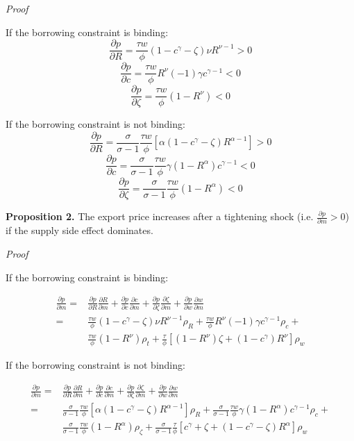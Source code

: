 \textit{Proof}

If the borrowing constraint is binding:
$$
\frac{\partial p}{\partial R}=\frac{\tau w}{\phi}(1-c^\gamma-\zeta)\nu R^{\nu-1}>0
$$
$$
\frac{\partial p}{\partial c}=\frac{\tau w}{\phi} R^\nu(-1)\gamma c^{\gamma-1}<0
$$
$$
\frac{\partial p}{\partial \zeta}=\frac{\tau w}{\phi}(1-R^\nu)<0
$$

If the borrowing constraint is not binding:
$$
\frac{\partial p}{\partial R}=\frac{\sigma}{\sigma-1}\frac{\tau w}{\phi}[\alpha(1-c^\gamma-\zeta)R^{\alpha-1}]>0
$$
$$
\frac{\partial p}{\partial c}=\frac{\sigma}{\sigma-1}\frac{\tau w}{\phi}\gamma(1-R^\alpha)c^{\gamma-1}<0
$$
$$
\frac{\partial p}{\partial \zeta}=\frac{\sigma}{\sigma-1}\frac{\tau w}{\phi} (1-R^\alpha)<0
$$


\textbf{Proposition 2.} The export price increases after a tightening shock (i.e. $\frac{\partial p}{\partial m}>0$) if the supply side effect dominates.

\textit{Proof}

If the borrowing constraint is binding:

\begin{align*} 
\frac{\partial p}{\partial m} =&\frac{\partial p}{\partial R}\frac{\partial R}{\partial m}+\frac{\partial p}{\partial c}\frac{\partial c}{\partial m}+\frac{\partial p}{\partial \zeta}\frac{\partial \zeta}{\partial m}+\frac{\partial p}{\partial w}\frac{\partial w}{\partial m}  \\
=& \frac{\tau w}{\phi}(1-c^\gamma-\zeta)\nu R^{\nu-1} \rho_R+ \frac{\tau w}{\phi} R^\nu(-1)\gamma c^{\gamma-1} \rho_c +\\  
& \frac{\tau w}{\phi}(1-R^\nu) \rho_t+\frac{\tau}{\phi}[(1-R^\nu)\zeta+(1-c^\gamma)R^\nu] \rho_w
\end{align*} 

If the borrowing constraint is not binding:

\begin{align*} 
\frac{\partial p}{\partial m} =&\frac{\partial p}{\partial R}\frac{\partial R}{\partial m}+\frac{\partial p}{\partial c}\frac{\partial c}{\partial m}+\frac{\partial p}{\partial \zeta}\frac{\partial \zeta}{\partial m}+\frac{\partial p}{\partial w}\frac{\partial w}{\partial m}  \\
=& \frac{\sigma}{\sigma-1}\frac{\tau w}{\phi}[\alpha(1-c^\gamma-\zeta)R^{\alpha-1}] \rho_R + \frac{\sigma}{\sigma-1}\frac{\tau w}{\phi}\gamma(1-R^\alpha)c^{\gamma-1} \rho_c + \\
& \frac{\sigma}{\sigma-1}\frac{\tau w}{\phi} (1-R^\alpha) \rho_\zeta + \frac{\sigma}{\sigma-1}\frac{\tau}{\phi}[c^\gamma+\zeta+(1-c^\gamma-\zeta)R^\alpha] \rho_w
\end{align*} 

